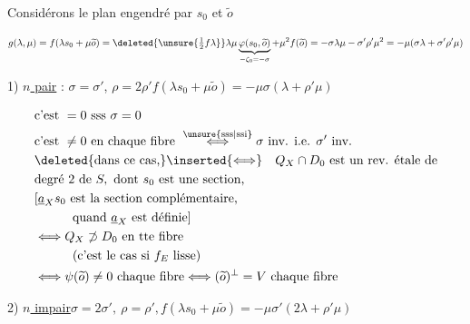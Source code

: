 Considérons le  plan engendré par $s_0$ et $\widetilde{o}$ 

\[
g(\lambda,\mu)=f(\lambda s_0+\mu\widetilde{o})=\deleted{\unsure{\tfrac12 f\lambda}}\lambda\mu\underbrace{\varphi(s_0,\widetilde{o})}_{-\zeta_0=-\sigma}+\mu^2 f(\widetilde{o})=-\sigma\lambda\mu-\sigma'\rho'\mu^2=-\mu(\sigma\lambda+\sigma'\rho'\mu)
\]

1) \uline{$n$ pair} : $\sigma=\sigma'$, $\rho=2\rho'$\qquad $f(\lambda s_0+\mu\widetilde{o})=-\mu\sigma(\lambda+\rho'\mu)$


\[
\begin{aligned}
&\text{c'est }=0\text{ sss }\sigma=0\\
&\text{c'est }\ne0\text{ en chaque fibre }\overset{\unsure{\text{sss}|\text{ssi}}}{\Longleftrightarrow}\sigma\ \text{inv. i.e. }\sigma'\ \text{inv.}\\
&\deleted{\text{dans ce cas,}}\inserted{\Longleftrightarrow}\quad Q_X\cap D_0\ \text{est un rev. étale de}\\
&\text{degré 2 de }S,\text{ dont }s_0\text{ est une section,}\\
&[\underline a_X s_0\text{ est la section complémentaire,}\\
&\hspace{3em}\text{quand }\underline a_X\text{ est définie}]\\
&\Longleftrightarrow Q_X\not\supset D_0\ \text{en tte fibre}\\
&\hspace{3em}(\text{c'est le cas si }f_E\ \text{lisse})\\
&\Longleftrightarrow\psi(\widetilde{o})\ne0\ \text{chaque fibre}\Longleftrightarrow(\widetilde{o})^\perp=V\ \text{chaque fibre}
\end{aligned}
\]

2) \uline{$n$ impair}\qquad $\sigma=2\sigma',\ \rho=\rho',$\qquad $f(\lambda s_0+\mu\widetilde{o})=-\mu\sigma'(2\lambda+\rho'\mu)$


